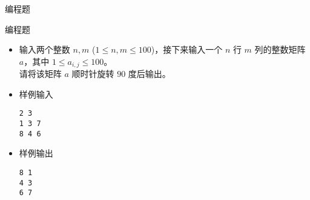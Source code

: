 \begin{frame}[fragile]
{{\begin{exampleblock}{编程题}
            \end{exampleblock}
        }{
            \begin{exampleblock}{编程题}

                \begin{itemize}
                    \item 输入两个整数 $n, m$ ($1 \le n, m \le 100$)，接下来输入一个 $n$ 行 $m$ 列的整数矩阵 $a$，其中 $1 \le a_{i,j} \le 100$。\\
                        请将该矩阵 $a$ 顺时针旋转 $90$ 度后输出。

                    \item 样例输入

                        \lstinline|2 3|\\
                        \lstinline|1 3 7|\\
                        \lstinline|8 4 6|

                    \item 样例输出

                        \lstinline|8 1|\\
                        \lstinline|4 3|\\
                        \lstinline|6 7|

                \end{itemize}

            \end{exampleblock}
        }
    }
\end{frame}

